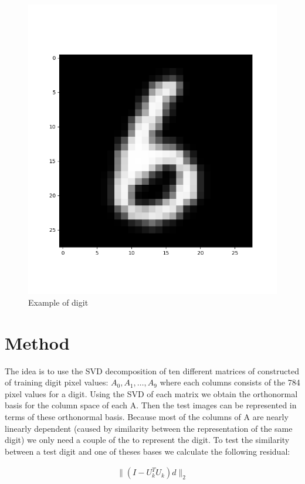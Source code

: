 \documentclass[a4paper]{article}
\begin{document}
\begin{figure}[ht!]
\centering
\includegraphics[scale=0.3]{example.png}
\caption{Example of digit}
\label{fig:dig}
\end{figure}


\section*{Method}
The idea is to use the SVD decomposition of ten different matrices of constructed of training digit pixel values: $A_0,A_1,\ldots,A_{9}$ where each columns consists of the 784 pixel values for a digit. Using the SVD of each matrix we obtain the  orthonormal basis for the column space of each A. Then the test images can be represented in terms of these orthonormal basis. Because most of the columns of A are nearly linearly dependent (caused by similarity between the representation of the same digit) we only need a couple of the to represent the digit.
To test the similarity between a test digit and one of theses bases we calculate the following residual:

\begin{equation}
	\begin{aligned}
		\|(I-U^{T}_kU_k)d\|_2
	\end{aligned}
\end{equation}
\end{document}
